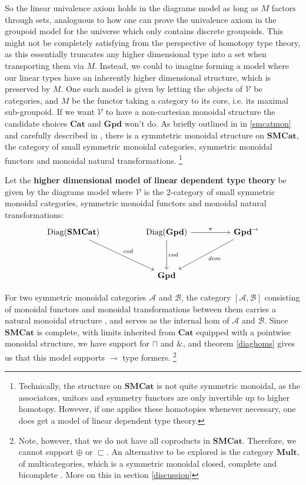 So the linear univalence axiom holds in the diagrams model as long as $M$ factors through sets, analoguous to how one can prove the univalence axiom in the groupoid model for the universe which only contains discrete groupoids. This might not be completely satisfying from the perspective of homotopy type theory, as this essentially truncates any higher dimensional type into a set when transporting them via $M$. Instead, we could to imagine forming a model where our linear types have an inherently higher dimensional structure, which is preserved by $M$. One such model is given by letting the objects of $\mathcal{V}$ be categories, and $M$ be the functor taking a category to its core, i.e. its maximal sub-groupoid. If we want $\mathcal{V}$ to have a non-cartesian monoidal structure the candidate choices $\mathbf{Cat}$ and $\mathbf{Gpd}$ won't do. As briefly outlined in in \ref{smcatmon} and carefully described in \cite{smcat}, there is a symmtetric monoidal structure on $\mathbf{SMCat}$, the category of small symmetric monoidal categories, symmetric monoidal functors and monoidal natural transformations. \footnote{Technically, the structure on $\mathbf{SMCat}$ is not quite symmetric monoidal, as the associators, unitors and symmetry functors are only invertible up to higher homotopy. However, if one applies these homotopies whenever necessary, one does get a model of linear dependent type theory.}
\begin{defn}
 Let the \textbf{higher dimensional model of linear dependent type theory} be given by the diagrams model where $\mathcal{V}$ is the 2-category of small symmetric monoidal categories, symmetric monoidal functors and monoidal natural transformations:
  \[
    \ti
    \diag(\mathbf{SMCat}) \ar[rd, "cod"] & \diag(\mathbf{Gpd}) \ar[r, "\pi"] \ar[d, "cod"] & \mathbf{Gpd}^\to \ar[ld, "dom"]\\
    & \mathbf{Gpd}
    \kz
  \]
\end{defn}
For two symmetric monoidal categories $\mathcal{A}$ and $\mathcal{B}$, the category $[\mathcal{A}, \mathcal{B}]$ consisting of monoidal functors and monoidal transformations between them carries a natural monoidal structure \cite{smcat}, and serves as the internal hom of $\mathcal{A}$ and $\mathcal{B}$. Since $\mathbf{SMCat}$ is complete, with limits inherited from $\mathbf{Cat}$ equipped with a pointwise monoidal structure, we have support for $\sqcap$ and $\&$, and theorem \ref{diaghoms} gives us that this model supports $\multimap$ type formers. \footnote{Note, however, that we do not have all coproducts in $\mathbf{SMCat}$. Therefore, we cannot support $\oplus$ or $\sqsubset$. An alternative to be explored is the category $\mathbf{Mult}$, of multicategories, which is a symmetric monoidal closed, complete and bicomplete \cite{elmendorf2009permutative}. More on this in section \ref{discussion}}
